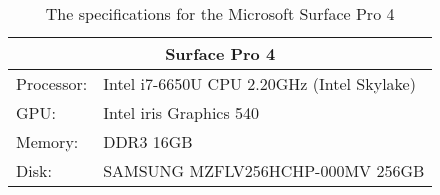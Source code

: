 \begin{table}[H]
    \begin{tabular}{ll}
    \hline
    \multicolumn{2}{|c|}{Surface Pro 4}           \\ \hline
    Processor: & Intel i7-6650U CPU 2.20GHz (Intel Skylake) \\
    GPU:       & Intel iris Graphics 540          \\
    Memory:    & DDR3 16GB                         \\
    Disk:      & SAMSUNG MZFLV256HCHP-000MV 256GB
    \end{tabular}
    \caption{The specifications for the Microsoft Surface Pro 4}
    \label{tab:surfacePro}
\end{table} 